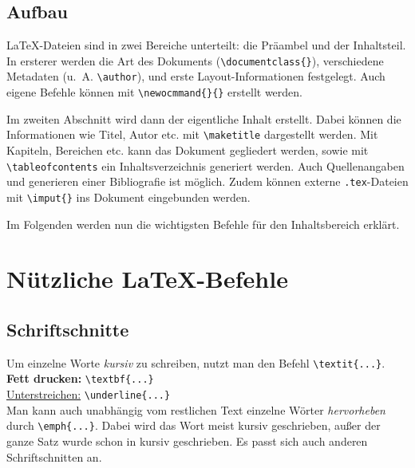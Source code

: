 \documentclass[ngerman]{scrreport}
\begin{document}
\section{Aufbau}

\LaTeX-Dateien sind in zwei Bereiche unterteilt: die Präambel und der Inhaltsteil. In ersterer werden die Art des Dokuments ({\color{blue}\verb|\documentclass{}|}), verschiedene Metadaten (u.~A. {\color{blue}\verb|\author|}), und erste Layout-Informationen festgelegt.
Auch eigene Befehle können mit {\color{blue}\verb|\newocmmand{}{}|} erstellt werden.

Im zweiten Abschnitt wird dann der eigentliche Inhalt erstellt. Dabei können die Informationen wie Titel, Autor etc. mit {\color{blue}\verb|\maketitle|} dargestellt werden. Mit Kapiteln, Bereichen etc. kann das Dokument gegliedert werden, sowie mit {\color{blue}\verb|\tableofcontents|} ein Inhaltsverzeichnis generiert werden.
Auch Quellenangaben und generieren einer Bibliografie ist möglich. Zudem können externe \texttt{.tex}-Dateien mit {\color{blue}\verb|\imput{}|} ins Dokument eingebunden werden.

Im Folgenden werden nun die wichtigsten Befehle für den Inhaltsbereich erklärt.

\chapter{\centering Nützliche \LaTeX{}-Befehle}

\section{Schriftschnitte}
Um einzelne Worte \textit{kursiv} zu schreiben, nutzt man den Befehl {\color{blue}\verb|\textit{...}|}.\\
\textbf{Fett drucken:} {\color{blue}\verb|\textbf{...}|}\\
\underline{Unterstreichen:} {\color{blue}\verb|\underline{...}|}\\
Man kann auch unabhängig vom restlichen Text einzelne Wörter \emph{hervorheben} durch {\color{blue}\verb|\emph{...}|}. Dabei wird das Wort meist kursiv geschrieben, außer der ganze Satz wurde schon in kursiv geschrieben. Es passt sich auch anderen Schriftschnitten an.
\end{document}
